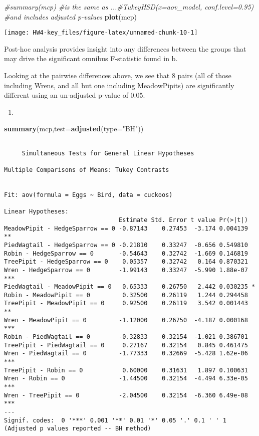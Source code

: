 \documentclass[]{article}
\newenvironment{Shaded}{\begin{snugshade}}{\end{snugshade}}
\newcommand{\KeywordTok}[1]{\textcolor[rgb]{0.13,0.29,0.53}{\textbf{#1}}}
\newcommand{\DataTypeTok}[1]{\textcolor[rgb]{0.13,0.29,0.53}{#1}}
\newcommand{\StringTok}[1]{\textcolor[rgb]{0.31,0.60,0.02}{#1}}
\newcommand{\CommentTok}[1]{\textcolor[rgb]{0.56,0.35,0.01}{\textit{#1}}}
\newcommand{\NormalTok}[1]{#1}
\begin{document}
\begin{Shaded}
\begin{Highlighting}[]
\CommentTok{#summary(mcp) #is the same as ...#TukeyHSD(x=aov_model, conf.level=0.95) #and includes adjusted p-values}
\KeywordTok{plot}\NormalTok{(mcp)}
\end{Highlighting}
\end{Shaded}

\texttt{[image: HW4-key\_files/figure-latex/unnamed-chunk-10-1]}

Post-hoc analysis provides insight into any differences between the
groups that may drive the significant omnibus F-statistic found in b.

Looking at the pairwise differences above, we see that 8 pairs (all of
those including Wrens, and all but one including MeadowPipits) are
significantly different using an un-adjusted p-value of 0.05.

\begin{enumerate}
\def\labelenumi{\alph{enumi}.}
\setcounter{enumi}{3}
\item
\end{enumerate}

\begin{Shaded}
\begin{Highlighting}[]
\KeywordTok{summary}\NormalTok{(mcp,}\DataTypeTok{test=}\KeywordTok{adjusted}\NormalTok{(}\DataTypeTok{type=}\StringTok{"BH"}\NormalTok{))}
\end{Highlighting}
\end{Shaded}

\begin{verbatim}

     Simultaneous Tests for General Linear Hypotheses

Multiple Comparisons of Means: Tukey Contrasts


Fit: aov(formula = Eggs ~ Bird, data = cuckoos)

Linear Hypotheses:
                                Estimate Std. Error t value Pr(>|t|)    
MeadowPipit - HedgeSparrow == 0 -0.87143    0.27453  -3.174 0.004139 ** 
PiedWagtail - HedgeSparrow == 0 -0.21810    0.33247  -0.656 0.549810    
Robin - HedgeSparrow == 0       -0.54643    0.32742  -1.669 0.146819    
TreePipit - HedgeSparrow == 0    0.05357    0.32742   0.164 0.870321    
Wren - HedgeSparrow == 0        -1.99143    0.33247  -5.990 1.88e-07 ***
PiedWagtail - MeadowPipit == 0   0.65333    0.26750   2.442 0.030235 *  
Robin - MeadowPipit == 0         0.32500    0.26119   1.244 0.294458    
TreePipit - MeadowPipit == 0     0.92500    0.26119   3.542 0.001443 ** 
Wren - MeadowPipit == 0         -1.12000    0.26750  -4.187 0.000168 ***
Robin - PiedWagtail == 0        -0.32833    0.32154  -1.021 0.386701    
TreePipit - PiedWagtail == 0     0.27167    0.32154   0.845 0.461475    
Wren - PiedWagtail == 0         -1.77333    0.32669  -5.428 1.62e-06 ***
TreePipit - Robin == 0           0.60000    0.31631   1.897 0.100631    
Wren - Robin == 0               -1.44500    0.32154  -4.494 6.33e-05 ***
Wren - TreePipit == 0           -2.04500    0.32154  -6.360 6.49e-08 ***
---
Signif. codes:  0 '***' 0.001 '**' 0.01 '*' 0.05 '.' 0.1 ' ' 1
(Adjusted p values reported -- BH method)
\end{verbatim}
\end{document}
